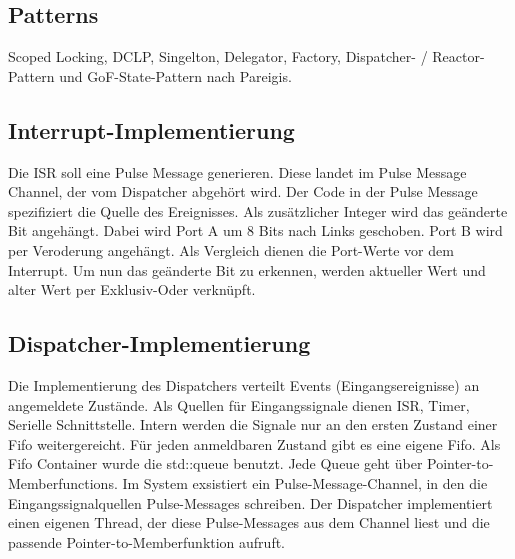 \documentclass[oneside,a4paper,titlepage]{scrartcl} %
\begin{document}
\subsection{Patterns}
Scoped Locking, DCLP, Singelton, Delegator, Factory, Dispatcher- / Reactor-Pattern und GoF-State-Pattern nach Pareigis.

\subsection{Interrupt-Implementierung}
Die ISR soll eine Pulse Message generieren. Diese landet im Pulse Message Channel, der vom Dispatcher abgehört wird.
Der Code in der Pulse Message spezifiziert die Quelle des Ereignisses. Als zusätzlicher Integer wird das geänderte Bit angehängt. Dabei wird Port A um 8 Bits nach Links geschoben. Port B wird per Veroderung angehängt. Als Vergleich dienen die Port-Werte vor dem Interrupt. Um nun das geänderte Bit zu erkennen, werden aktueller Wert und alter Wert per Exklusiv-Oder verknüpft.
\newpage

\subsection{Dispatcher-Implementierung}
Die Implementierung des Dispatchers verteilt Events (Eingangsereignisse) an angemeldete Zustände.
Als Quellen für Eingangssignale dienen ISR, Timer, Serielle Schnittstelle. Intern werden die Signale
nur an den ersten Zustand einer Fifo weitergereicht. Für jeden anmeldbaren Zustand gibt es eine eigene Fifo. \newline
Als Fifo Container wurde die std::queue benutzt. Jede Queue geht über Pointer-to-Memberfunctions.
Im System exsistiert ein Pulse-Message-Channel, in den die Eingangssignalquellen Pulse-Messages schreiben.
Der Dispatcher implementiert einen eigenen Thread, der diese Pulse-Messages aus dem Channel liest und die passende Pointer-to-Memberfunktion aufruft.

\end{document}
